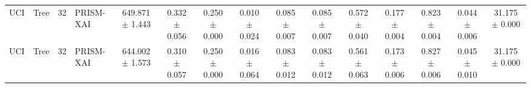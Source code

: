 \begin{table}[t]
\begin{tabular}{llllccccccccccc}
UCI & Tree & 32 & PRISM-XAI & 649.871 $\pm$ 1.443 & 0.332 $\pm$ 0.056 & 0.250 $\pm$ 0.000 & 0.010 $\pm$ 0.024 & 0.085 $\pm$ 0.007 & 0.085 $\pm$ 0.007 & 0.572 $\pm$ 0.040 & 0.177 $\pm$ 0.004 & 0.823 $\pm$ 0.004 & 0.044 $\pm$ 0.006 & 31.175 $\pm$ 0.000 \\
UCI & Tree & 32 & PRISM-XAI & 644.002 $\pm$ 1.573 & 0.310 $\pm$ 0.057 & 0.250 $\pm$ 0.000 & 0.016 $\pm$ 0.064 & 0.083 $\pm$ 0.012 & 0.083 $\pm$ 0.012 & 0.561 $\pm$ 0.063 & 0.173 $\pm$ 0.006 & 0.827 $\pm$ 0.006 & 0.045 $\pm$ 0.010 & 31.175 $\pm$ 0.000 \\
\bottomrule
\end{tabular}
\end{table}
